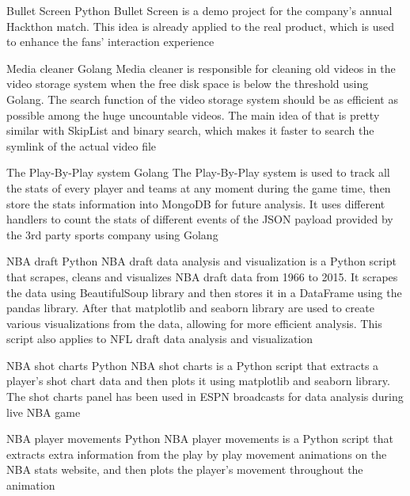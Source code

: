 \documentclass[11pt,a4paper]{moderncv}
\begin{document}
\vspace*{0.2\baselineskip}
\cventry{}
{Bullet Screen}
{Python}
{}{}
{
Bullet Screen is a demo project for the company's annual Hackthon match. This idea is already applied to the real product, which is used to enhance the fans' interaction experience
}

\vspace*{0.2\baselineskip}
\cventry{}
{Media cleaner}
{Golang}
{}{}
{
Media cleaner is responsible for cleaning old videos in the video storage system when the free disk space is below the threshold using Golang. The search function of the video storage system should be as efficient as possible among the huge uncountable videos. The main idea of that is pretty similar with SkipList and binary search, which makes it faster to search the symlink of the actual video file
}

\vspace*{0.2\baselineskip}
\cventry{}
{The Play-By-Play system}
{Golang}
{}{}
{
The Play-By-Play system is used to track all the stats of every player and teams at any moment during the game time, then store the stats information into MongoDB for future analysis. It uses different handlers to count the stats of different events of the JSON payload provided by the 3rd party sports company using Golang
}

\vspace*{0.2\baselineskip}
\cventry{}
{NBA draft}
{Python}
{}{}
{
NBA draft data analysis and visualization is a Python script that scrapes, cleans and visualizes NBA draft data from 1966 to 2015. It scrapes the data using BeautifulSoup library and then stores it in a DataFrame using the pandas library. After that matplotlib and seaborn library are used to create various visualizations from the data, allowing for more efficient analysis. This script also applies to NFL draft data analysis and visualization
}

\vspace*{0.2\baselineskip}
\cventry{}
{NBA shot charts}
{Python}
{}{}
{
NBA shot charts is a Python script that extracts a player’s shot chart data and then plots it using matplotlib and seaborn library. The shot charts panel has been used in ESPN broadcasts for data analysis during live NBA game
}

\vspace*{0.2\baselineskip}
\cventry{}
{NBA player movements}
{Python}
{}{}
{
NBA player movements is a Python script that extracts extra information from the play by play movement animations on the NBA stats website, and then plots the player's movement throughout the animation
}
\end{document}
